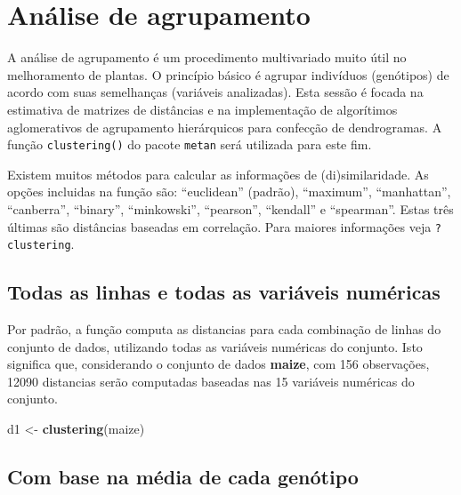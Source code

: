 \documentclass[
]{book}
\newenvironment{Shaded}{\begin{snugshade}}{\end{snugshade}}
\newcommand{\KeywordTok}[1]{\textcolor[rgb]{0.13,0.29,0.53}{\textbf{#1}}}
\newcommand{\NormalTok}[1]{#1}
\newcommand{\StringTok}[1]{\textcolor[rgb]{0.31,0.60,0.02}{#1}}
\begin{document}
\hypertarget{anuxe1lise-de-agrupamento}{%
\section{Análise de agrupamento}\label{anuxe1lise-de-agrupamento}}

A análise de agrupamento  é um procedimento multivariado muito útil no melhoramento de plantas. O princípio básico é agrupar indivíduos (genótipos) de acordo com suas semelhanças (variáveis analizadas). Esta sessão é focada na estimativa de matrizes de distâncias e na implementação de algorítimos aglomerativos de agrupamento hierárquicos para confecção de dendrogramas.  A função \texttt{clustering()}  do pacote \texttt{metan} será utilizada para este fim.

Existem muitos métodos para calcular as informações de (di)similaridade. As opções incluidas na função são: ``euclidean'' (padrão), ``maximum'', ``manhattan'', ``canberra'', ``binary'', ``minkowski'', ``pearson'', ``kendall'' e ``spearman''. Estas três últimas são distâncias baseadas em correlação. Para maiores informações veja \texttt{?clustering}.

\hypertarget{todas-as-linhas-e-todas-as-variuxe1veis-numuxe9ricas}{%
\subsection{Todas as linhas e todas as variáveis numéricas}\label{todas-as-linhas-e-todas-as-variuxe1veis-numuxe9ricas}}

Por padrão, a função computa as distancias para cada combinação de linhas do conjunto de dados, utilizando todas as variáveis numéricas do conjunto. Isto significa que, considerando o conjunto de dados \textbf{maize}, com 156 observações, 12090 distancias serão computadas baseadas nas 15 variáveis numéricas do conjunto.

\begin{Shaded}
\begin{Highlighting}[]
\NormalTok{d1 <-}\StringTok{ }\KeywordTok{clustering}\NormalTok{(maize)}
\end{Highlighting}
\end{Shaded}

\hypertarget{com-base-na-muxe9dia-de-cada-genuxf3tipo}{%
\subsection{Com base na média de cada genótipo}\label{com-base-na-muxe9dia-de-cada-genuxf3tipo}}
\end{document}
